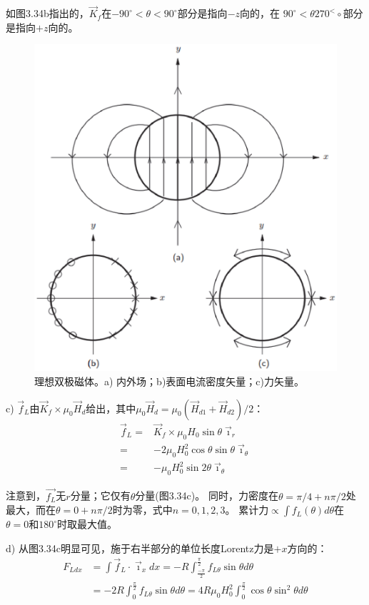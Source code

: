 如图3.34b指出的，$\vec{K}_f$在$-90^\circ<\theta<90^\circ$部分是指向$-z$向的，在
$90^\circ<\theta270^<\circ$部分是指向$+z$向的。
\begin{figure}[htbp]
	\centering
	\includegraphics[scale=0.5]{chpt3/figs/fig3.34.eps}
	\caption{理想双极磁体。a) 内外场；b)表面电流密度矢量；c)力矢量。}
\end{figure}

c) $\vec{f}_L$由$\vec{K}_f\times\mu_0 \vec{H}_d$给出，其中$\mu_0 \vec{H}_d=\mu_0(\vec{H}_{d1}+\vec{H}_{d2})/2$：
\begin{align*}
\vec{f}_{L}=&\vec{K}_{f}\times\mu_{0}H_{0}\sin\theta\vec{\imath}_{r}\tag{S8.1}\\
=&-2\mu_{0}H_{0}^{2}\cos\theta \sin\theta\vec{\imath}_{\theta}\\
=&-\mu_{0}H_{0}^{2}\sin 2\theta\vec{\imath}_{\theta}\tag{3.141}
\end{align*}

注意到，$\vec{f_L}$无$r$分量；它仅有$\theta$分量(图3.34c)。
同时，力密度在$\theta=\pi/4+n\pi/2$处最大，而在$\theta=0+n\pi/2$时为零，式中$n=0, 1, 2, 3$。
累计力$\propto\int f_L(\theta)d\theta$在$\theta=0$和$180^\circ$时取最大值。

d) 从图3.34c明显可见，施于右半部分的单位长度Lorentz力是$+x$方向的：
\begin{align*}
F_{Ldx}&=\int\vec{f}_{L}\cdot\vec{\imath}_{x}dx=-R\int_{\frac{-\pi}{2}}^{\frac{\pi}{2}}f_{L\theta}\sin\theta d\theta\tag{S8.2a}\\
&=-2R\int_{0}^{\frac{\pi}{2}}f_{L\theta}\sin\theta d\theta=4R\mu_{0}H_{0}^{2}\int_{0}^{\frac{\pi}{2}}\cos\theta \sin^{2}\theta d\theta\tag{S8.2b}
\end{align*}

